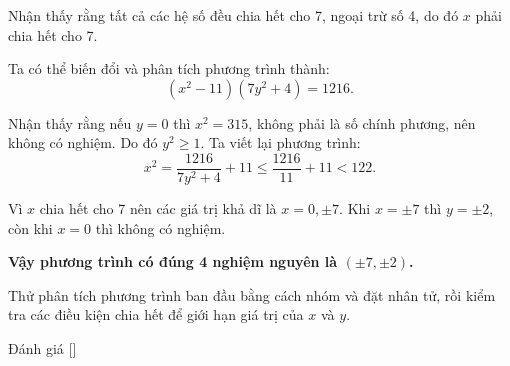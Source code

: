 \ifshowproblemandsoln
\ifshowproblem{}
\fi

\ifshowsoln
\begin{soln}\footnotemark
    Nhận thấy rằng tất cả các hệ số đều chia hết cho 7, ngoại trừ số 4, do đó \(x\) phải chia hết cho 7.

    Ta có thể biến đổi và phân tích phương trình thành:
    \[
        (x^2 - 11)(7y^2 + 4) = 1216.
    \]

    Nhận thấy rằng nếu \(y = 0\) thì \(x^2 = 315\), không phải là số chính phương, nên không có nghiệm. Do đó \(y^2 \geq 1\). Ta viết lại phương trình:
    \[
        x^2 = \frac{1216}{7y^2 + 4} + 11 \leq \frac{1216}{11} + 11 < 122.
    \]

    Vì \(x\) chia hết cho 7 nên các giá trị khả dĩ là \(x = 0, \pm7\). Khi \(x = \pm7\) thì \(y = \pm2\), còn khi \(x = 0\) thì không có nghiệm.

    \textbf{Vậy phương trình có đúng 4 nghiệm nguyên là \( (\pm7, \pm2) \).}
\end{soln}
\fi

\ifshowhint
\begin{hint*}
    Thử phân tích phương trình ban đầu bằng cách nhóm và đặt nhân tử, rồi kiểm tra các điều kiện chia hết để giới hạn giá trị của \(x\) và \(y\).
\end{hint*}
\fi

\ifshowremark
\begin{remark*}
    Đánh giá [\textbf{}]
\end{remark*}
\newpage
\fi